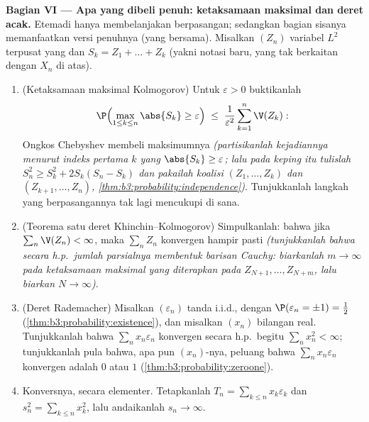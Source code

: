 \begin{problem}
\medskip
\noindent\textbf{Bagian VI --- Apa yang dibeli  penuh:
ketaksamaan maksimal dan deret acak.} Etemadi hanya
membelanjakan  berpasangan; sedangkan bagian sisanya memanfaatkan
versi penuhnya (yang bersama). Misalkan $(Z_n)$ variabel $L^2$
terpusat yang  dan $S_k = Z_1 + \dots + Z_k$ (yakni notasi
baru, yang tak berkaitan dengan $X_n$ di atas).
\begin{enumerate}[resume]
  \item (Ketaksamaan maksimal Kolmogorov) Untuk $\varepsilon
        > 0$ buktikanlah
        \[
        \P\Bigl(\max_{1\leq k\leq n}\abs{S_k} \geq
        \varepsilon\Bigr) \;\leq\;
        \frac1{\varepsilon^2}\sum_{k=1}^n\V(Z_k) :
        \]
        Ongkos Chebyshev membeli maksimumnya \emph{(partisikanlah
        kejadiannya menurut indeks pertama $k$ yang
        $\abs{S_k} \geq \varepsilon$; lalu pada keping itu tulislah
        $S_n^2 \geq S_k^2 + 2S_k(S_n - S_k)$ dan pakailah
         koalisi $(Z_1, \dots, Z_k)$
        dan $(Z_{k+1}, \dots, Z_n)$,
        \cref{thm:b3:probability:independence})}. Tunjukkanlah
        langkah yang  berpasangannya tak lagi
        mencukupi di sana.
  \item (Teorema satu deret Khinchin--Kolmogorov) Simpulkanlah:
        bahwa jika $\sum_n\V(Z_n) < \infty$, maka $\sum_nZ_n$
        konvergen hampir pasti \emph{(tunjukkanlah bahwa secara h.p.\
        jumlah parsialnya membentuk barisan Cauchy: biarkanlah $m \to
        \infty$ pada ketaksamaan maksimal yang diterapkan pada
        $Z_{N+1}, \dots, Z_{N+m}$, lalu biarkan $N \to
        \infty$)}.
  \item (Deret Rademacher) Misalkan $(\varepsilon_n)$
        tanda i.i.d., dengan $\P(\varepsilon_n = \pm1) =
        \frac12$ (\cref{thm:b3:probability:existence}), dan
        misalkan $(x_n)$ bilangan real. Tunjukkanlah bahwa
        $\sum_nx_n\varepsilon_n$ konvergen secara h.p.\ begitu
        $\sum_nx_n^2 < \infty$; tunjukkanlah pula bahwa, apa pun
        $(x_n)$-nya, peluang bahwa
        $\sum_nx_n\varepsilon_n$ konvergen adalah $0$ atau $1$
        (\cref{thm:b3:probability:zeroone}).
  \item Konversnya, secara elementer. Tetapkanlah $T_n = \sum_{k\leq
        n}x_k\varepsilon_k$ dan $s_n^2 = \sum_{k\leq
        n}x_k^2$, lalu andaikanlah $s_n \to \infty$.

\end{enumerate}
\end{problem}

